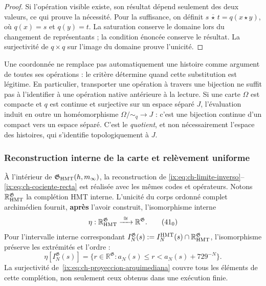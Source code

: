 \begin{proof}
Si l'opération visible existe, son résultat dépend seulement des deux valeurs, ce qui prouve la nécessité. Pour la suffisance, on définit \(s\,\overline\star\,t=q(x\star y)\), où \(q(x)=s\) et \(q(y)=t\). La saturation conserve le domaine lors du changement de représentants ; la condition énoncée conserve le résultat. La surjectivité de \(q\times q\) sur l'image du domaine prouve l'unicité.
\end{proof}

Une coordonnée ne remplace pas automatiquement une histoire comme argument de
toutes ses opérations : le critère détermine quand cette substitution est
légitime. En particulier, transporter une opération à travers une bijection
ne suffit pas à l’identifier à une opération native antérieure à la lecture.
Si une carte \(\Omega\) est compacte et \(q\) est continue et surjective
sur un espace séparé \(J\), l’évaluation induit en outre un
homéomorphisme \(\Omega/{\sim_q}\to J\) : c’est une bijection continue d’un
compact vers un espace séparé. C’est le \emph{quotient}, et non nécessairement
l’espace des histoires, qui s’identifie topologiquement à \(J\).



\subsubsection{Reconstruction interne de la carte et relèvement uniforme}

À l'intérieur de \(\mathfrak G_{\rm HMT}(h,m_\infty)\), la reconstruction de \eqref{ix:eq:ch-limite-inverso}--\eqref{ix:eq:ch-cociente-recta} est réalisée avec les mêmes codes et opérateurs. Notons \(\mathbb R_{\rm HMT}^{\mathfrak G}\) la complétion HMT interne. L'unicité du corps ordonné complet archimédien fournit, \textbf{après} l'avoir construit, l'isomorphisme interne
\[
 \eta:\mathbb R_{\rm HMT}^{\mathfrak G}
 \xrightarrow{\ \cong\ }\mathbb R^{\mathfrak G}.
\tag{41$_0$}\label{ix:eq:ch-isomorfismo-interno}
\]
Pour l’intervalle interne correspondant
\(I_N^{\mathfrak G}(s):=
 I_N^{\rm HMT}(s)\cap\mathbb R_{\rm HMT}^{\mathfrak G}\), l’isomorphisme
préserve les extrémités et l’ordre :
\[
 \eta[I_N^{\mathfrak G}(s)]
 =\{r\in\mathbb R^{\mathfrak G}:
      a_N(s)\le r<a_N(s)+729^{-N}\}.
\tag{41$_0$a}\label{ix:eq:ch-intervalos-internos}
\]
La surjectivité de~\eqref{ix:eq:ch-proyeccion-arquimediana} couvre tous les éléments de cette complétion, non
seulement ceux obtenus dans une exécution finie.

